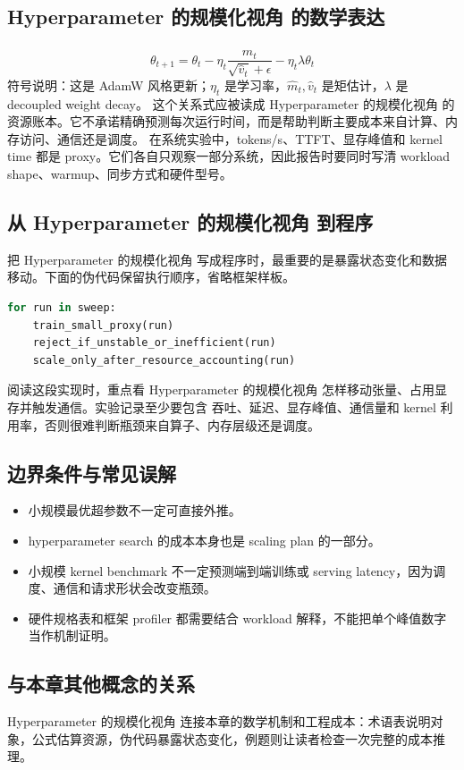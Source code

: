 \documentclass[a4paper]{article}
\begin{document}
\subsection{Hyperparameter 的规模化视角 的数学表达}
\[\theta_{t+1}=\theta_t-\eta_t\frac{\hat m_t}{\sqrt{\hat v_t}+\epsilon}-\eta_t\lambda\theta_t\]
符号说明：这是 AdamW 风格更新；\(\eta_t\) 是学习率，\(\hat m_t,\hat v_t\) 是矩估计，\(\lambda\) 是 decoupled weight decay。
这个关系式应被读成 Hyperparameter 的规模化视角 的资源账本。它不承诺精确预测每次运行时间，而是帮助判断主要成本来自计算、内存访问、通信还是调度。
在系统实验中，tokens/s、TTFT、显存峰值和 kernel time 都是 proxy。它们各自只观察一部分系统，因此报告时要同时写清 workload shape、warmup、同步方式和硬件型号。
\subsection{从 Hyperparameter 的规模化视角 到程序}
把 Hyperparameter 的规模化视角 写成程序时，最重要的是暴露状态变化和数据移动。下面的伪代码保留执行顺序，省略框架样板。
\begin{lstlisting}[language=Python]
for run in sweep:
    train_small_proxy(run)
    reject_if_unstable_or_inefficient(run)
    scale_only_after_resource_accounting(run)
\end{lstlisting}
阅读这段实现时，重点看 Hyperparameter 的规模化视角 怎样移动张量、占用显存并触发通信。实验记录至少要包含 吞吐、延迟、显存峰值、通信量和 kernel 利用率，否则很难判断瓶颈来自算子、内存层级还是调度。
\subsection{边界条件与常见误解}
\begin{itemize}
\item 小规模最优超参数不一定可直接外推。
\item hyperparameter search 的成本本身也是 scaling plan 的一部分。
\item 小规模 kernel benchmark 不一定预测端到端训练或 serving latency，因为调度、通信和请求形状会改变瓶颈。
\item 硬件规格表和框架 profiler 都需要结合 workload 解释，不能把单个峰值数字当作机制证明。
\end{itemize}
\subsection{与本章其他概念的关系}
Hyperparameter 的规模化视角 连接本章的数学机制和工程成本：术语表说明对象，公式估算资源，伪代码暴露状态变化，例题则让读者检查一次完整的成本推理。
\end{document}
